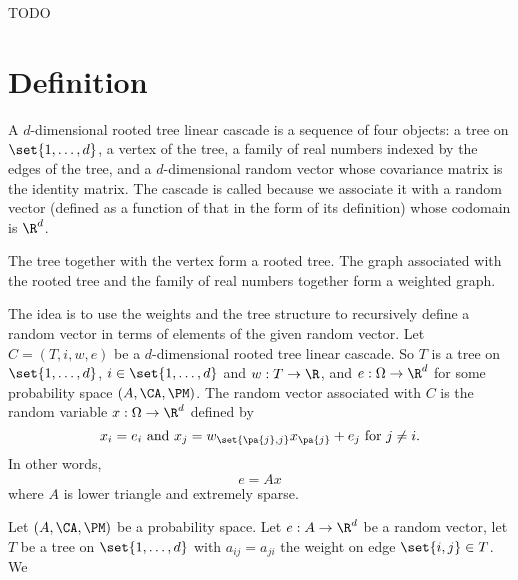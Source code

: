 
TODO

\section{Definition}

A \t{$d$-dimensional rooted tree linear cascade} is a sequence of four objects: a tree on $\set{1, \dots, d}$, a vertex of the tree, a family of real numbers indexed by the edges of the tree, and a $d$-dimensional random vector whose covariance matrix is the identity matrix.
The cascade is called  because we associate it with a random vector (defined as a function of that in the form of its definition) whose codomain is  $\R^d$.

The tree together with the vertex form a rooted tree.
The graph associated with the rooted tree and the family of real numbers together form a weighted graph.

The idea is to use the weights and the tree structure to recursively define a random vector in terms of elements of the given random vector.
Let $C = (T, i, w, e)$ be a $d$-dimensional rooted tree linear cascade.
So $T$ is a tree on $\set{1, \dots, d}$, $i \in \set{1, \dots, d}$ and $w: T \to \R$, and $e: \Omega \to \R^d$ for some probability space $(A, \CA, \PM)$.
The random vector associated with $C$ is the random variable $x: \Omega \to \R^d$ defined by
$$
  x_i = e_i \text{ and } x_j = w_{\set{\pa{j}, j}}x_{\pa{j}} + e_{j} \text{ for } j \neq i.
$$
In other words,
$$
  e = Ax
$$
where $A$ is lower triangle and extremely sparse.


Let $(A, \CA, \PM)$ be a probability space.
Let $e: A \to \R^d$ be a random vector, let $T$ be a tree on $\set{1, \dots, d}$ with $a_{ij} = a_{ji}$ the weight on edge $\set{i, j} \in T$.
We


\strats
